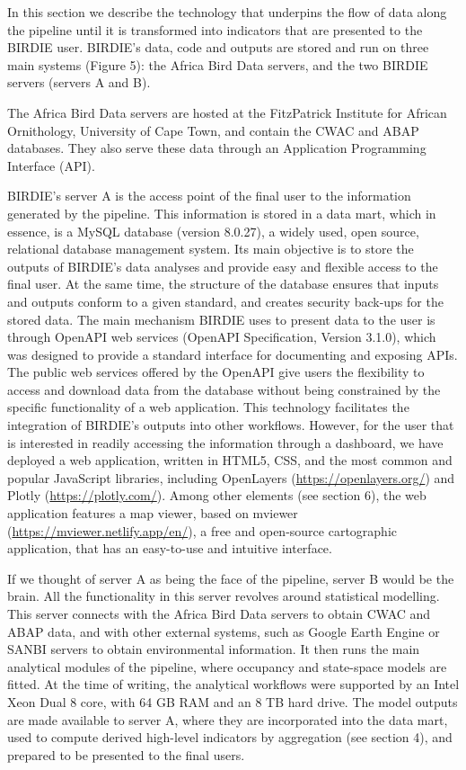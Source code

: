 \documentclass[utf8]{frontiersSCNS}
\begin{document}
In this section we describe the technology that underpins the flow of
data along the pipeline until it is transformed into indicators that are
presented to the BIRDIE user. BIRDIE's data, code and outputs are stored
and run on three main systems (Figure 5): the Africa Bird Data servers,
and the two BIRDIE servers (servers A and B).

The Africa Bird Data servers are hosted at the FitzPatrick Institute for
African Ornithology, University of Cape Town, and contain the CWAC and
ABAP databases. They also serve these data through an Application
Programming Interface (API).

BIRDIE's server A is the access point of the final user to the
information generated by the pipeline. This information is stored in a
data mart, which in essence, is a MySQL database (version 8.0.27), a
widely used, open source, relational database management system. Its
main objective is to store the outputs of BIRDIE's data analyses and
provide easy and flexible access to the final user. At the same time,
the structure of the database ensures that inputs and outputs conform to
a given standard, and creates security back-ups for the stored data. The
main mechanism BIRDIE uses to present data to the user is through
OpenAPI web services (OpenAPI Specification, Version 3.1.0), which was
designed to provide a standard interface for documenting and exposing
APIs. The public web services offered by the OpenAPI give users the
flexibility to access and download data from the database without being
constrained by the specific functionality of a web application. This
technology facilitates the integration of BIRDIE's outputs into other
workflows. However, for the user that is interested in readily accessing
the information through a dashboard, we have deployed a web application,
written in HTML5, CSS, and the most common and popular JavaScript
libraries, including OpenLayers (\url{https://openlayers.org/}) and
Plotly (\url{https://plotly.com/}). Among other elements (see section
6), the web application features a map viewer, based on mviewer
(\url{https://mviewer.netlify.app/en/}), a free and open-source
cartographic application, that has an easy-to-use and intuitive
interface.

If we thought of server A as being the face of the pipeline, server B
would be the brain. All the functionality in this server revolves around
statistical modelling. This server connects with the Africa Bird Data
servers to obtain CWAC and ABAP data, and with other external systems,
such as Google Earth Engine or SANBI servers to obtain environmental
information. It then runs the main analytical modules of the pipeline,
where occupancy and state-space models are fitted. At the time of
writing, the analytical workflows were supported by an Intel Xeon Dual 8
core, with 64 GB RAM and an 8 TB hard drive. The model outputs are made
available to server A, where they are incorporated into the data mart,
used to compute derived high-level indicators by aggregation (see
section 4), and prepared to be presented to the final users.
\end{document}
